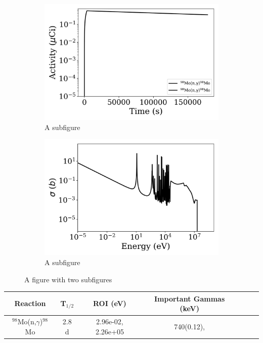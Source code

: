 \begin{figure}[h]
\centering
\begin{subfigure}{.5\textwidth}
  \centering
     \includegraphics[width=.8\textwidth]{plot/Mo-98(n,gamma)Mo-98_wisconsin1} 

  \caption{A subfigure}
  \label{fig:sub1}
\end{subfigure}%
\begin{subfigure}{.5\textwidth}
  \centering
     \includegraphics[width=.8\textwidth]{plot/Mo-98(n,gamma)Mo-98} 

  \caption{A subfigure}
  \label{fig:sub2}
\end{subfigure}
\caption{A figure with two subfigures}
\label{fig:test}
\end{figure}

\begin{table}[h]
\centering
\begin{tabular}{ |c|c|c|c|c|c|c| }
 \hline
 Reaction & T$_{1/2}$ & ROI (eV) & Important Gammas (keV) \\
 \hline 
 $^{98}$Mo(n,$\gamma$)$^{98}$Mo &  2.8 d & 2.96e-02, 2.26e+05 & 740(0.12),  \\ 
\hline
\end{tabular}
\end{table}
